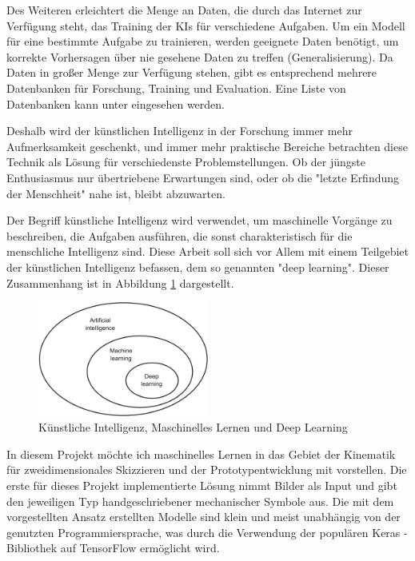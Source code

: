 Des Weiteren erleichtert die Menge an Daten, die durch das Internet zur Verfügung steht, das Training der KIs für verschiedene Aufgaben.
Um ein Modell für eine bestimmte Aufgabe zu trainieren, werden geeignete Daten benötigt, um korrekte Vorhersagen über nie gesehene Daten zu treffen (Generalisierung).
Da Daten in großer Menge zur Verfügung stehen, gibt es entsprechend mehrere Datenbanken für Forschung, Training und Evaluation.
Eine Liste von Datenbanken kann unter  eingesehen werden.

Deshalb wird der künstlichen Intelligenz in der Forschung immer mehr Aufmerksamkeit geschenkt, und immer mehr praktische Bereiche betrachten diese Technik als Lösung für verschiedenste Problemstellungen.
Ob der jüngste Enthusiasmus nur übertriebene Erwartungen sind, oder ob die "letzte Erfindung der Menschheit" \cite{Good1965} nahe ist, bleibt abzuwarten.

Der Begriff künstliche Intelligenz wird verwendet, um maschinelle Vorgänge zu beschreiben, die Aufgaben ausführen, die sonst charakteristisch für die menschliche Intelligenz sind.
Diese Arbeit soll sich vor Allem mit einem Teilgebiet der künstlichen Intelligenz befassen, dem so genannten "deep learning".
Dieser Zusammenhang ist in Abbildung \ref{fig:ai_ml_dl} dargestellt.

\begin{figure}
    \includegraphics[width=0.5\textwidth]{images/ai_ml_dl.png}
    \caption[KI, ML und DL]{Künstliche Intelligenz, Maschinelles Lernen und Deep Learning \cite[p.4]{Chollet2017}}
    \label{fig:ai_ml_dl}
\end{figure}

In diesem Projekt möchte ich maschinelles Lernen in das Gebiet der Kinematik für zweidimensionales Skizzieren und der Prototypentwicklung mit  vorstellen.
Die erste für dieses Projekt implementierte Lösung nimmt Bilder als Input und gibt den jeweiligen Typ handgeschriebener mechanischer Symbole aus.
Die mit dem vorgestellten Ansatz erstellten Modelle sind klein und meist unabhängig von der genutzten Programmiersprache, was durch die Verwendung der populären Keras \cite{Chollet}-Bibliothek auf TensorFlow \cite{Google2019} ermöglicht wird.

